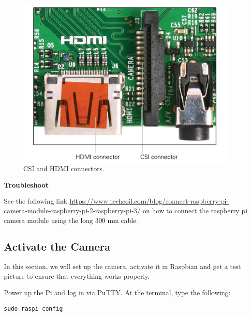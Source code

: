 \begin{figure}[!htb]
\begin{center}
\includegraphics[scale=0.280]{img/raspberrypi/raspberrypi_hdmi_csi.jpeg}
\end{center}
\caption{ CSI and HDMI connectors.}
\label{raspberrypi_hdmi_csi}
\end{figure}

\begin{framed}
\begin{remark}{\textbf{Troubleshoot}}


See the following link  
\url{https:/​/​www.​techcoil.​com/​blog/​connect-​raspberry-​pi-​camera-​module-​raspberry-​pi-2-​raspberry-​pi-​3/}
on how to connect the raspberry pi camera module using the long 300 mm cable. 
\end{remark}
\end{framed}

\subsection{Activate the Camera}
\label{activate_camera}

In this section, we will set up the camera, activate it in Raspbian and get a test
picture to ensure that everything works properly. 

Power up the Pi and log in via PuTTY. At the terminal, type the following:

\begin{lstlisting}
sudo raspi-config
\end{lstlisting}

